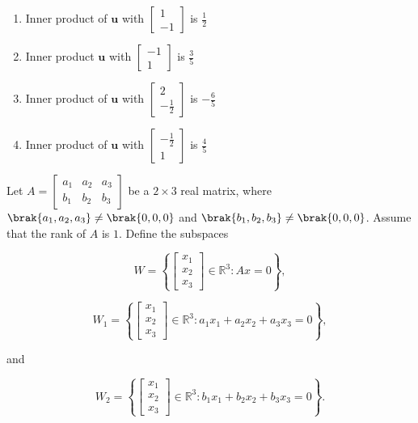 \begin{enumerate}[label=\brak{\Alph*}]
\item Inner product of $\mathbf{u}$ with $\begin{bmatrix} 1 \\ -1 \end{bmatrix}$ is $\frac{1}{2}$

\item Inner product $\mathbf{u}$ with $\begin{bmatrix} -1 \\ 1 \end{bmatrix}$ is $\frac{3}{5}$ 

\item Inner product of $\mathbf{u}$ with $\begin{bmatrix} 2 \\ -\frac{1}{2} \end{bmatrix}$ is $-\frac{6}{5}$

\item Inner product of $\mathbf{u}$ with $\begin{bmatrix} -\frac{1}{2} \\ 1 \end{bmatrix}$ is $\frac{4}{5}$
\end{enumerate}

\item Let $A = \begin{bmatrix} a_1 & a_2 & a_3 \\ b_1 & b_2 & b_3 \end{bmatrix}$ be a $2 \times 3$ real matrix, where $\brak{a_1, a_2, a_3} \neq \brak{0,0,0}$ and $\brak{b_1, b_2, b_3} \neq \brak{0,0,0}$. Assume that the rank of $A$ is $1$. Define the subspaces 

$$W = \left\{ \begin{bmatrix} x_1 \\ x_2 \\ x_3 \end{bmatrix} \in \mathbb{R}^3 : Ax = 0 \right\},$$

$$W_1 = \left\{ \begin{bmatrix} x_1 \\ x_2 \\ x_3 \end{bmatrix} \in \mathbb{R}^3 : a_1x_1 + a_2x_2 + a_3x_3 = 0 \right\},$$

and

$$W_2 = \left\{ \begin{bmatrix} x_1 \\ x_2 \\ x_3 \end{bmatrix} \in \mathbb{R}^3 : b_1x_1 + b_2x_2 + b_3x_3 = 0 \right\}.$$

